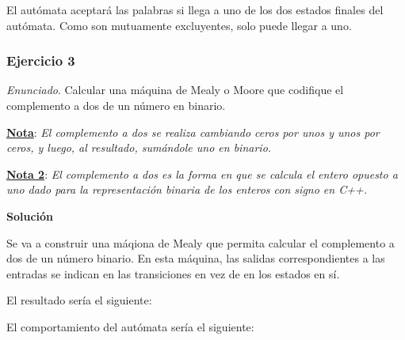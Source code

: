 \documentclass[11pt,a4paper]{article}
\newcommand{\enu}{\textit{Enunciado}}
\newcommand{\sol}{\textbf{Solución}}
\begin{document}
		El autómata aceptará las palabras si llega a uno de los dos estados finales del autómata. Como son mutuamente
		excluyentes, solo puede llegar a uno. 
			
		\subsubsection{Ejercicio 3}
		\enu. Calcular una máquina de Mealy o Moore que codifique el complemento a dos de un número en binario. \par
		\textbf{\underline{Nota}}: \textit{El complemento a dos se realiza cambiando ceros por unos y unos por ceros, y
		luego, al resultado, sumándole uno en binario.} \par
		\textbf{\underline{Nota 2}}: \textit{El complemento a dos es la forma en que se calcula el entero opuesto a uno
		dado para la representación binaria de los enteros con signo en C++.} \par
		
		\sol \par
		
		Se va a construir una máqiona de Mealy que permita calcular el complemento a dos de un número binario. En esta
		máquina, las salidas correspondientes a las entradas se indican en las transiciones en vez de en los estados en
		sí. \par
		
		El resultado sería el siguiente:
		
		\begin{center}
		\end{center}
		
		El comportamiento del autómata sería el siguiente:
		
\end{document}
